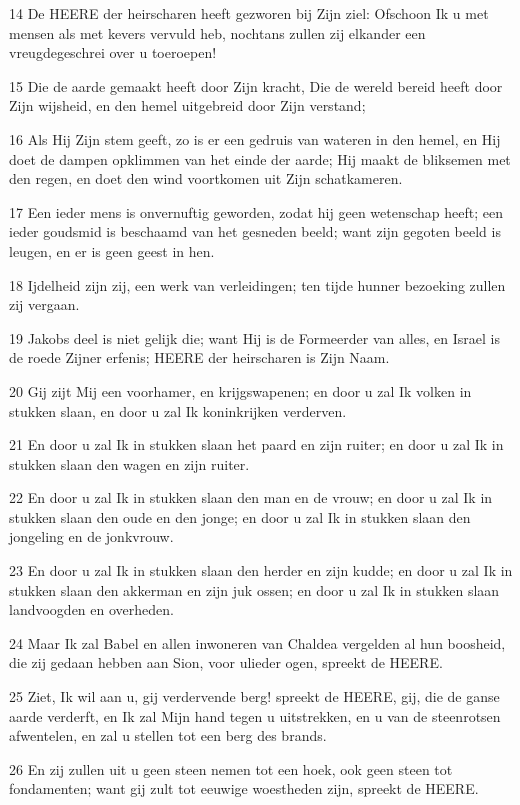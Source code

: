 \par 14 De HEERE der heirscharen heeft gezworen bij Zijn ziel: Ofschoon Ik u met mensen als met kevers vervuld heb, nochtans zullen zij elkander een vreugdegeschrei over u toeroepen!
\par 15 Die de aarde gemaakt heeft door Zijn kracht, Die de wereld bereid heeft door Zijn wijsheid, en den hemel uitgebreid door Zijn verstand;
\par 16 Als Hij Zijn stem geeft, zo is er een gedruis van wateren in den hemel, en Hij doet de dampen opklimmen van het einde der aarde; Hij maakt de bliksemen met den regen, en doet den wind voortkomen uit Zijn schatkameren.
\par 17 Een ieder mens is onvernuftig geworden, zodat hij geen wetenschap heeft; een ieder goudsmid is beschaamd van het gesneden beeld; want zijn gegoten beeld is leugen, en er is geen geest in hen.
\par 18 Ijdelheid zijn zij, een werk van verleidingen; ten tijde hunner bezoeking zullen zij vergaan.
\par 19 Jakobs deel is niet gelijk die; want Hij is de Formeerder van alles, en Israel is de roede Zijner erfenis; HEERE der heirscharen is Zijn Naam.
\par 20 Gij zijt Mij een voorhamer, en krijgswapenen; en door u zal Ik volken in stukken slaan, en door u zal Ik koninkrijken verderven.
\par 21 En door u zal Ik in stukken slaan het paard en zijn ruiter; en door u zal Ik in stukken slaan den wagen en zijn ruiter.
\par 22 En door u zal Ik in stukken slaan den man en de vrouw; en door u zal Ik in stukken slaan den oude en den jonge; en door u zal Ik in stukken slaan den jongeling en de jonkvrouw.
\par 23 En door u zal Ik in stukken slaan den herder en zijn kudde; en door u zal Ik in stukken slaan den akkerman en zijn juk ossen; en door u zal Ik in stukken slaan landvoogden en overheden.
\par 24 Maar Ik zal Babel en allen inwoneren van Chaldea vergelden al hun boosheid, die zij gedaan hebben aan Sion, voor ulieder ogen, spreekt de HEERE.
\par 25 Ziet, Ik wil aan u, gij verdervende berg! spreekt de HEERE, gij, die de ganse aarde verderft, en Ik zal Mijn hand tegen u uitstrekken, en u van de steenrotsen afwentelen, en zal u stellen tot een berg des brands.
\par 26 En zij zullen uit u geen steen nemen tot een hoek, ook geen steen tot fondamenten; want gij zult tot eeuwige woestheden zijn, spreekt de HEERE.

